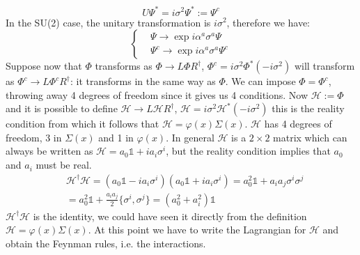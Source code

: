 \documentclass[../main.tex]{subfiles}
\begin{document}
\[
U\Psi^*=i\sigma^2\Psi^*:=\Psi^c
\]
In the SU(2) case, the unitary transformation is $i\sigma^2$, therefore we have:
\[
\left\{
\begin{aligned}
&\Psi\to\exp{i\alpha^a\sigma^a}\Psi\\
&\Psi^c\to\exp{i\alpha^a\sigma^a}\Psi^c
\end{aligned}
\right.
\]
Suppose now that $\Phi$ transforms as $\Phi\to L\Phi R^\dagger$, $\Phi^c=i\sigma^2\Phi^*(-i\sigma^2)$ will transform as $\Phi^c\to L\Phi^c R^\dagger$: it transforms in the same way as $\Phi$. We can impose $\Phi=\Phi^c$, throwing away 4 degrees of freedom since it gives us 4 conditions. Now $\mathcal{H}:=\Phi$ and it is possible to define $\mathcal{H}\to L\mathcal{H}R^\dagger$, $\mathcal{H}=i\sigma^2\mathcal{H}^*(-i\sigma^2)$ this is the reality condition from which it follows that $\mathcal{H}=\varphi(x)\Sigma(x)$. $\mathcal{H}$ has 4 degrees of freedom, 3 in $\Sigma(x)$ and 1 in $\varphi(x)$. In general $\mathcal{H}$ is a $2\times2$ matrix which can always be written as $\mathcal{H}=a_0\mathbb{1}+ia_i\sigma^i$, but the reality condition implies that $a_0$ and $a_i$ must be real.
\begin{align*}
&\mathcal{H}^\dagger\mathcal{H}=(a_0\mathbb{1}-ia_i\sigma^i)(a_0\mathbb{1}+ia_i\sigma^i)=a_0^2\mathbb{1}+a_ia_j\sigma^i\sigma^j\\
&=a_0^2\mathbb{1}+\frac{a_ia_j}{2}\{\sigma^i,\sigma^j\}=(a_0^2+a_i^2)\mathbb{1}
\end{align*}
$\mathcal{H}^\dagger\mathcal{H}$ is the identity, we could have seen it directly from the definition $\mathcal{H}=\varphi(x)\Sigma(x)$. At this point we have to write the Lagrangian for $\mathcal{H}$ and obtain the Feynman rules, i.e. the interactions.
\end{document}
